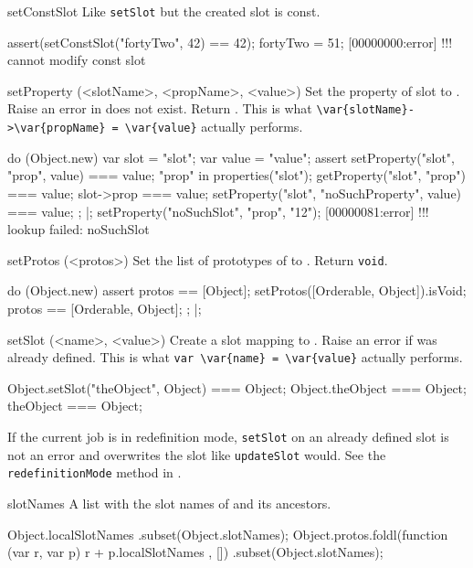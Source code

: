 \begin{urbiscriptapi}
\item[setConstSlot]
  Like \lstinline|setSlot| but the created slot is const.
\begin{urbiscript}
assert(setConstSlot("fortyTwo", 42) == 42);
fortyTwo = 51;
[00000000:error] !!! cannot modify const slot
\end{urbiscript}

\item[setProperty](<slotName>, <propName>, <value>)%
  Set the property  of slot  to .
  Raise an error in  does not exist.  Return .
  This is what \lstinline|\var{slotName}->\var{propName} = \var{value}|
  actually performs.
\begin{urbiscript}
do (Object.new)
{
  var slot = "slot";
  var value = "value";
  assert
  {
    setProperty("slot", "prop", value) === value;
    "prop" in properties("slot");
    getProperty("slot", "prop") === value;
    slot->prop === value;
    setProperty("slot", "noSuchProperty", value) === value;
  };
}|;
setProperty("noSuchSlot", "prop", "12");
[00000081:error] !!! lookup failed: noSuchSlot
\end{urbiscript}


\item[setProtos](<protos>)%
  Set the list of prototypes of \this to .  Return
  \lstinline|void|.
\begin{urbiscript}
do (Object.new)
{
  assert
  {
    protos == [Object];
    setProtos([Orderable, Object]).isVoid;
    protos == [Orderable, Object];
  };
}|;
\end{urbiscript}

\item[setSlot](<name>, <value>)%
  Create a slot  mapping to . Raise an error if
   was already defined.  This is what
  \lstinline|var \var{name} = \var{value}| actually performs.
\begin{urbiassert}
Object.setSlot("theObject", Object) === Object;
Object.theObject === Object;
theObject === Object;
\end{urbiassert}

  If the current job is in redefinition mode, \lstinline|setSlot| on
  an already defined slot is not an error and overwrites the slot like
  \lstinline|updateSlot| would. See the \lstinline|redefinitionMode|
  method in .

\item[slotNames]%
  A list with the slot names of \this and its ancestors.
\begin{urbiassert}
Object.localSlotNames
  .subset(Object.slotNames);
Object.protos.foldl(function (var r, var p) { r + p.localSlotNames },
                    [])
  .subset(Object.slotNames);
\end{urbiassert}


\end{urbiscriptapi}
